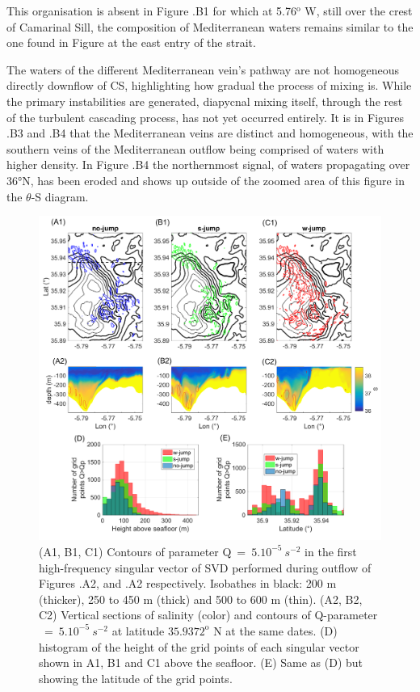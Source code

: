 This organisation is absent in Figure .B1 for which at 5.76$^{\text{o}}$ W, still over the crest of Camarinal Sill, the composition of Mediterranean waters remains similar to the one found in Figure  at the east entry of the strait.

The waters of the different Mediterranean vein's pathway are not homogeneous directly downflow of CS, highlighting how gradual the process of mixing is. While the primary instabilities are generated, diapycnal mixing itself, through the rest of the turbulent cascading process, has not yet occurred entirely. It is in Figures .B3 and .B4 that the Mediterranean veins are distinct and homogeneous, with the southern veins of the Mediterranean outflow being comprised of waters with higher density. In Figure .B4 the northernmost signal, of waters propagating  over 36°N, has been eroded and shows up outside of the zoomed area of this figure in the $\theta$-S diagram. 

\begin{figure}[!h]
 \includegraphics[width=\textwidth]{./GBR3D/EOF5_MIV_2D.png}
 \caption[SVD of parameter Q across simulations SimNT, SimIT and SimST.]{(A1, B1, C1) Contours of parameter Q$\ =\ 5.10^{-5} \ s^{-2}$ in the first high-frequency singular vector of SVD performed during outflow of Figures .A2, and .A2 respectively. Isobathes in black: 200 m (thicker), 250 to 450 m (thick) and 500 to 600 m (thin). (A2, B2, C2) Vertical sections of salinity (color) and contours of Q-parameter $\ =\ 5.10^{-5}\ s^{-2}$ at latitude $35.9372^\text{o}$ N at the same dates. (D) histogram of the height of the grid points of each singular vector shown in A1, B1 and C1 above the seafloor. (E) Same as (D) but showing the latitude of the grid points.}
 \label{FigEOFMIV}
\end{figure}


